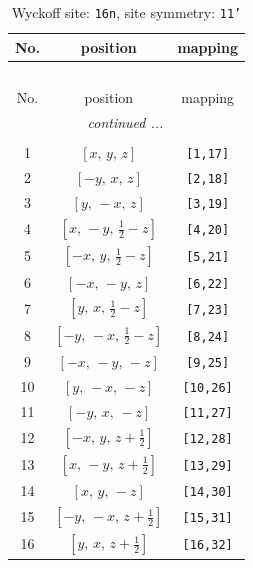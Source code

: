 \documentclass[fleqn,8pt]{jsarticle}
\begin{document}
\begin{longtable}{ccc}
\caption{Wyckoff site: {\tt 16n}, site symmetry: {\tt 11'}}
 \\
 \hline \hline
No. & position & mapping \\ \hline \endfirsthead

\multicolumn{2}{l}{\tablename\ \thetable{}} \\
 \hline \hline
No. & position & mapping \\ \hline \endhead

 \hline \hline
\multicolumn{2}{r}{\footnotesize\it continued ...} \\ \endfoot

 \hline \hline
\multicolumn{2}{r}{} \\ \endlastfoot

1 & $\left[ x,\, y,\, z \right]$ & {\tt [1,17]} \\ \hline
2 & $\left[ - y,\, x,\, z \right]$ & {\tt [2,18]} \\ \hline
3 & $\left[ y,\, - x,\, z \right]$ & {\tt [3,19]} \\ \hline
4 & $\left[ x,\, - y,\, \frac{1}{2} - z \right]$ & {\tt [4,20]} \\ \hline
5 & $\left[ - x,\, y,\, \frac{1}{2} - z \right]$ & {\tt [5,21]} \\ \hline
6 & $\left[ - x,\, - y,\, z \right]$ & {\tt [6,22]} \\ \hline
7 & $\left[ y,\, x,\, \frac{1}{2} - z \right]$ & {\tt [7,23]} \\ \hline
8 & $\left[ - y,\, - x,\, \frac{1}{2} - z \right]$ & {\tt [8,24]} \\ \hline
9 & $\left[ - x,\, - y,\, - z \right]$ & {\tt [9,25]} \\ \hline
10 & $\left[ y,\, - x,\, - z \right]$ & {\tt [10,26]} \\ \hline
11 & $\left[ - y,\, x,\, - z \right]$ & {\tt [11,27]} \\ \hline
12 & $\left[ - x,\, y,\, z + \frac{1}{2} \right]$ & {\tt [12,28]} \\ \hline
13 & $\left[ x,\, - y,\, z + \frac{1}{2} \right]$ & {\tt [13,29]} \\ \hline
14 & $\left[ x,\, y,\, - z \right]$ & {\tt [14,30]} \\ \hline
15 & $\left[ - y,\, - x,\, z + \frac{1}{2} \right]$ & {\tt [15,31]} \\ \hline
16 & $\left[ y,\, x,\, z + \frac{1}{2} \right]$ & {\tt [16,32]} \\
\end{longtable}
\end{document}
